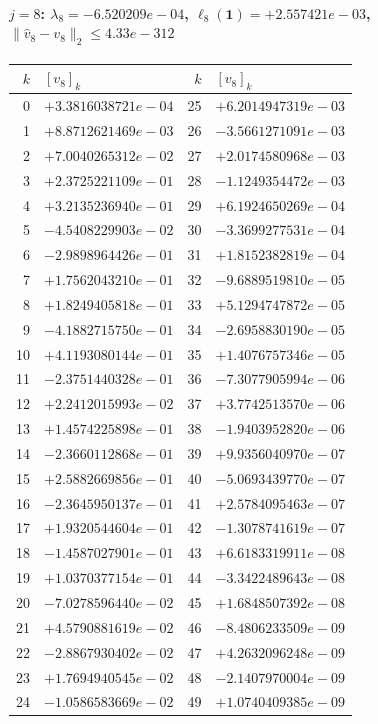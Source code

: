 \paragraph{$j = 8$: $\lambda_{8} = -6.520209e-04$, \quad $\ell_{8}(\mathbf{1}) = +2.557421e-03$, \quad $\|\hat{v}_{8} - v_{8}\|_2 \leq 4.33e-312$}
\begin{center}
{\footnotesize
\begin{tabular}{r@{\;\;}l@{\quad}r@{\;\;}l}
\toprule
$k$ & $[v_{8}]_k$ & $k$ & $[v_{8}]_k$ \\
\midrule
0 & $+3.3816038721e-04$ & 25 & $+6.2014947319e-03$ \\
1 & $+8.8712621469e-03$ & 26 & $-3.5661271091e-03$ \\
2 & $+7.0040265312e-02$ & 27 & $+2.0174580968e-03$ \\
3 & $+2.3725221109e-01$ & 28 & $-1.1249354472e-03$ \\
4 & $+3.2135236940e-01$ & 29 & $+6.1924650269e-04$ \\
5 & $-4.5408229903e-02$ & 30 & $-3.3699277531e-04$ \\
6 & $-2.9898964426e-01$ & 31 & $+1.8152382819e-04$ \\
7 & $+1.7562043210e-01$ & 32 & $-9.6889519810e-05$ \\
8 & $+1.8249405818e-01$ & 33 & $+5.1294747872e-05$ \\
9 & $-4.1882715750e-01$ & 34 & $-2.6958830190e-05$ \\
10 & $+4.1193080144e-01$ & 35 & $+1.4076757346e-05$ \\
11 & $-2.3751440328e-01$ & 36 & $-7.3077905994e-06$ \\
12 & $+2.2412015993e-02$ & 37 & $+3.7742513570e-06$ \\
13 & $+1.4574225898e-01$ & 38 & $-1.9403952820e-06$ \\
14 & $-2.3660112868e-01$ & 39 & $+9.9356040970e-07$ \\
15 & $+2.5882669856e-01$ & 40 & $-5.0693439770e-07$ \\
16 & $-2.3645950137e-01$ & 41 & $+2.5784095463e-07$ \\
17 & $+1.9320544604e-01$ & 42 & $-1.3078741619e-07$ \\
18 & $-1.4587027901e-01$ & 43 & $+6.6183319911e-08$ \\
19 & $+1.0370377154e-01$ & 44 & $-3.3422489643e-08$ \\
20 & $-7.0278596440e-02$ & 45 & $+1.6848507392e-08$ \\
21 & $+4.5790881619e-02$ & 46 & $-8.4806233509e-09$ \\
22 & $-2.8867930402e-02$ & 47 & $+4.2632096248e-09$ \\
23 & $+1.7694940545e-02$ & 48 & $-2.1407970004e-09$ \\
24 & $-1.0586583669e-02$ & 49 & $+1.0740409385e-09$ \\
\bottomrule
\end{tabular}
}
\end{center}

